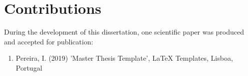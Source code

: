 \chapter*{Contributions}
During the development of this dissertation, one scientific paper was produced and accepted for publication:
\begin{enumerate}[\hspace{1.5cm} ]
  \item Pereira, I. (2019) 'Master Thesis Template', LaTeX Templates, Lisboa, Portugal
\end{enumerate}
